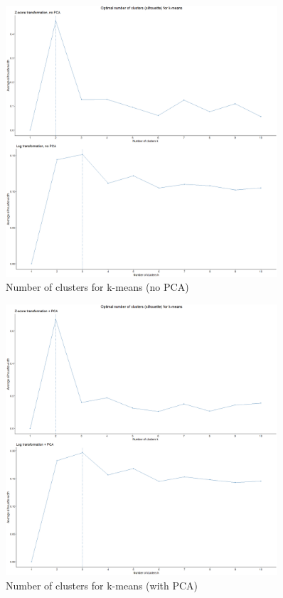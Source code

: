 \documentclass{article}
\begin{document}
	
	\begin{figure}[h]
		\centering
		\includegraphics[width=0.9\textwidth]{proj2_plots/kmeans_clust_num.png}
		\caption{Number of clusters for k-means (no PCA)}
		\label{fig::clust_num_kmeans}
	\end{figure}

	\begin{figure}[h]
		\centering
		\includegraphics[width=0.9\textwidth]{proj2_plots/kmeans_clust_num_pca.png}
		\caption{Number of clusters for k-means (with PCA)}
		\label{fig::clust_num_keans_pca}
	\end{figure}
	
\end{document}
